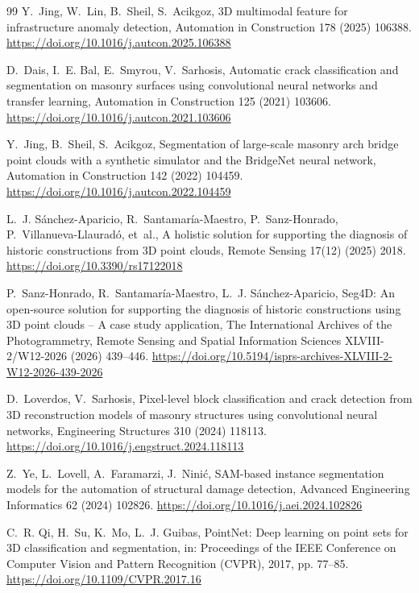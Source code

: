 \documentclass[5p]{elsarticle}
\begin{document}
\begin{thebibliography}{99}
 Y.~Jing, W.~Lin, B.~Sheil, S.~Acikgoz, 3D multimodal feature for infrastructure anomaly detection, Automation in Construction 178 (2025) 106388. \url{https://doi.org/10.1016/j.autcon.2025.106388}

 D.~Dais, I.~E. Bal, E.~Smyrou, V.~Sarhosis, Automatic crack classification and segmentation on masonry surfaces using convolutional neural networks and transfer learning, Automation in Construction 125 (2021) 103606. \url{https://doi.org/10.1016/j.autcon.2021.103606}

 Y.~Jing, B.~Sheil, S.~Acikgoz, Segmentation of large-scale masonry arch bridge point clouds with a synthetic simulator and the BridgeNet neural network, Automation in Construction 142 (2022) 104459. \url{https://doi.org/10.1016/j.autcon.2022.104459}

 L.~J. Sánchez-Aparicio, R.~Santamaría-Maestro, P.~Sanz-Honrado, P.~Villanueva-Llauradó, et~al., A holistic solution for supporting the diagnosis of historic constructions from 3D point clouds, Remote Sensing 17(12) (2025) 2018. \url{https://doi.org/10.3390/rs17122018}

 P.~Sanz-Honrado, R.~Santamaría-Maestro, L.~J. Sánchez-Aparicio, Seg4D: An open-source solution for supporting the diagnosis of historic constructions using 3D point clouds -- A case study application, The International Archives of the Photogrammetry, Remote Sensing and Spatial Information Sciences XLVIII-2/W12-2026 (2026) 439--446. \url{https://doi.org/10.5194/isprs-archives-XLVIII-2-W12-2026-439-2026}

 D.~Loverdos, V.~Sarhosis, Pixel-level block classification and crack detection from 3D reconstruction models of masonry structures using convolutional neural networks, Engineering Structures 310 (2024) 118113. \url{https://doi.org/10.1016/j.engstruct.2024.118113}

 Z.~Ye, L.~Lovell, A.~Faramarzi, J.~Nini\'{c}, SAM-based instance segmentation models for the automation of structural damage detection, Advanced Engineering Informatics 62 (2024) 102826. \url{https://doi.org/10.1016/j.aei.2024.102826}


 C.~R. Qi, H.~Su, K.~Mo, L.~J. Guibas, PointNet: Deep learning on point sets for 3D classification and segmentation, in: Proceedings of the IEEE Conference on Computer Vision and Pattern Recognition (CVPR), 2017, pp. 77--85. \url{https://doi.org/10.1109/CVPR.2017.16}


\end{thebibliography}
\end{document}
